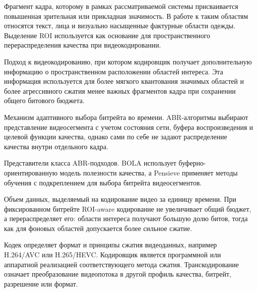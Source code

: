 \documentclass[12pt,a4paper,oneside,openany]{report}
\begin{document}
\begin{description}[style=nextline,leftmargin=1.25cm,labelsep=0.5em]

  \item[ROI, область интереса]
      Фрагмент кадра, которому в рамках рассматриваемой системы присваивается повышенная
      зрительная или прикладная значимость. В работе к таким областям относятся текст,
      лица и визуально насыщенные фактурные области одежды. Выделение ROI используется
      как основание для пространственного перераспределения качества при видеокодировании.

  \item[ROI-aware кодирование]
      Подход к видеокодированию, при котором кодировщик получает дополнительную информацию
      о пространственном расположении областей интереса. Эта информация используется для
      более мягкого квантования значимых областей и более агрессивного сжатия менее важных
      фрагментов кадра при сохранении общего битового бюджета.

  \item[ABR, Adaptive Bitrate]
      Механизм адаптивного выбора битрейта во времени. ABR-алгоритмы выбирают представление
      видеосегмента с учетом состояния сети, буфера воспроизведения и целевой функции качества,
      однако сами по себе не задают распределение качества внутри отдельного кадра.

  \item[BOLA, Pensieve]
      Представители класса ABR-подходов. BOLA использует буферно-ориентированную модель
      полезности качества, а Pensieve применяет методы обучения с подкреплением для выбора
      битрейта видеосегментов.

  \item[Битрейт]
      Объем данных, выделяемый на кодирование видео за единицу времени. При фиксированном
      битрейте ROI-aware кодирование не увеличивает общий бюджет, а перераспределяет его:
      области интереса получают большую долю битов, тогда как для фоновых областей допускается
      более сильное сжатие.

  \item[Кодек, кодировщик, транскодирование]
      Кодек определяет формат и принципы сжатия видеоданных, например H.264/AVC или
      H.265/HEVC. Кодировщик является программной или аппаратной реализацией соответствующего
      метода сжатия. Транскодирование означает преобразование видеопотока в другой профиль
      качества, битрейт, разрешение или формат.


\end{description}
\end{document}
